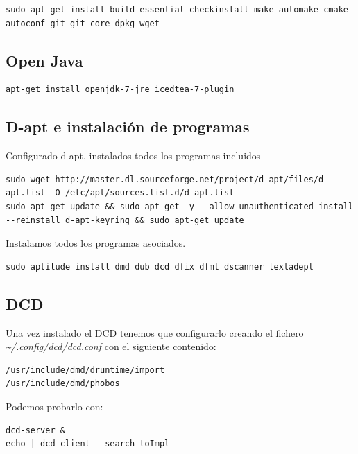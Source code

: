 \documentclass[12pt,spanish,]{article}
\begin{document}
\begin{verbatim}
sudo apt-get install build-essential checkinstall make automake cmake autoconf git git-core dpkg wget
\end{verbatim}

\subsection{Open Java}\label{open-java}

\begin{verbatim}
apt-get install openjdk-7-jre icedtea-7-plugin
\end{verbatim}

\subsection{D-apt e instalación de
programas}\label{d-apt-e-instalaciuxf3n-de-programas}

Configurado d-apt, instalados todos los programas incluidos

\begin{verbatim}
sudo wget http://master.dl.sourceforge.net/project/d-apt/files/d-apt.list -O /etc/apt/sources.list.d/d-apt.list
sudo apt-get update && sudo apt-get -y --allow-unauthenticated install --reinstall d-apt-keyring && sudo apt-get update
\end{verbatim}

Instalamos todos los programas asociados.

\begin{verbatim}
sudo aptitude install dmd dub dcd dfix dfmt dscanner textadept
\end{verbatim}

\subsection{DCD}\label{dcd}

Una vez instalado el DCD tenemos que configurarlo creando el fichero
\emph{\textasciitilde{}/.config/dcd/dcd.conf} con el siguiente
contenido:

\begin{verbatim}
/usr/include/dmd/druntime/import
/usr/include/dmd/phobos
\end{verbatim}

Podemos probarlo con:

\begin{verbatim}
dcd-server &
echo | dcd-client --search toImpl
\end{verbatim}
\end{document}
